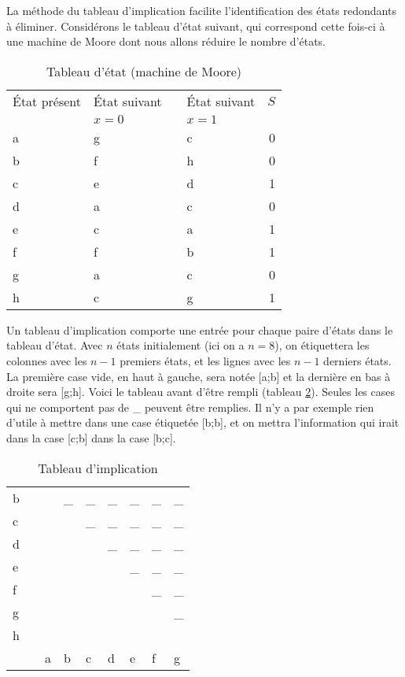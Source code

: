 \documentclass[11pt]{article}
\begin{document}
La méthode du tableau d'implication facilite l'identification des
états redondants à éliminer. Considérons le tableau d'état suivant,
qui correspond cette fois-ci à une machine de Moore dont nous allons
réduire le nombre d'états.

\begin{table}[htbp]
\caption{\label{tab:org60b9a8c}Tableau d'état (machine de Moore)}
\centering
\begin{tabular}{llllr}
État présent & État suivant &  & État suivant & \(S\)\\
 & \(x=0\) &  & \(x=1\) & \\
\hline
a & g &  & c & 0\\
b & f &  & h & 0\\
c & e &  & d & 1\\
d & a &  & c & 0\\
e & c &  & a & 1\\
f & f &  & b & 1\\
g & a &  & c & 0\\
h & c &  & g & 1\\
\end{tabular}
\end{table}

Un tableau d'implication comporte une entrée pour chaque paire d'états
dans le tableau d'état. Avec \(n\) états initialement (ici on a
\(n=8\)), on étiquettera les colonnes avec les \(n-1\) premiers états,
et les lignes avec les \(n-1\) derniers états. La première case vide,
en haut à gauche, sera notée [a;b] et la dernière en bas à droite sera
[g;h]. Voici le tableau avant d'être rempli (tableau
\ref{tab:org97ca72c}). Seules les cases qui ne comportent pas de \_
peuvent être remplies. Il n'y a par exemple rien d'utile à mettre dans
une case étiquetée [b;b], et on mettra l'information qui irait dans la
case [c;b] dans la case [b;c].

\begin{table}[htbp]
\caption{\label{tab:org97ca72c}Tableau d'implication}
\centering
\begin{tabular}{lllllllll}
b &  &  & \_ & \_ & \_ & \_ & \_ & \_\\
c &  &  &  & \_ & \_ & \_ & \_ & \_\\
d &  &  &  &  & \_ & \_ & \_ & \_\\
e &  &  &  &  &  & \_ & \_ & \_\\
f &  &  &  &  &  &  & \_ & \_\\
g &  &  &  &  &  &  &  & \_\\
h &  &  &  &  &  &  &  & \\
\hline
 &  & a & b & c & d & e & f & g\\
\end{tabular}
\end{table}
\end{document}
